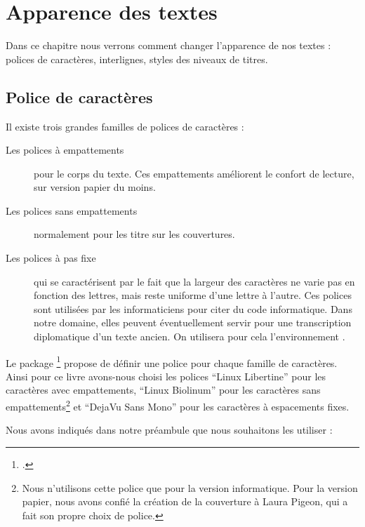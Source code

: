 \chapter{Apparence des textes}


\begin{intro}
Dans ce chapitre nous verrons comment changer l'apparence de nos textes : polices de caractères, interlignes, styles des niveaux de titres.  
\end{intro}

\section{Police de caractères}

Il existe trois grandes familles de polices de caractères : 
\begin{description}
\item[Les polices à empattements]pour le corps du texte. Ces empattements améliorent le confort de lecture, sur version papier du moins. 
\item[Les polices sans empattements]normalement pour les titre sur les couvertures.
\item[Les polices à pas fixe]qui se caractérisent par le fait que la largeur des caractères ne varie pas en fonction des lettres, mais reste uniforme d'une lettre à l'autre. Ces polices sont utilisées par les informaticiens pour citer du code informatique. Dans notre domaine, elles peuvent éventuellement servir pour une transcription diplomatique d'un texte ancien. On utilisera pour cela  l'environnement .
\end{description}

Le package \footcite{fontspec} propose de définir une police pour chaque famille de caractères. Ainsi pour ce livre avons-nous choisi les polices \enquote{Linux Libertine} pour les caractères avec empattements, \enquote{Linux Biolinum} pour les caractères sans empattements\footnote{Nous n'utilisons cette police que pour la version informatique. Pour la version papier, nous avons confié la création de la couverture à Laura Pigeon, qui a fait son propre choix de police.} et \enquote{DejaVu  Sans Mono} pour les caractères à espacements fixes.

Nous avons indiqués dans notre préambule que nous souhaitons les utiliser :

\begin{latexcode}
\setmainfont[Mapping=tex-text]{Linux Libertine}
\setsansfont[Mapping=tex-text]{Linux Biolinum}
\setmonofont[Scale=0.75]{DejaVu  Sans Mono}
\end{latexcode}

